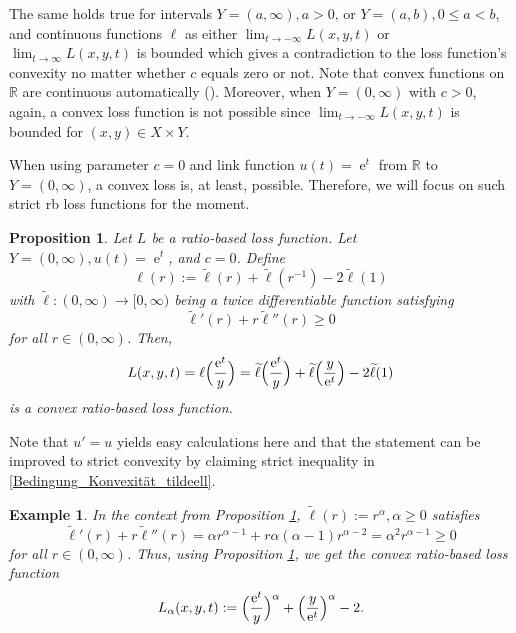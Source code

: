 \documentclass[10pt]{article}
\newcommand{\R}{\mathbb{R}}
\newcommand{\XY}{X \times Y}
\DeclareMathOperator{\e}{e}
\newtheorem{proposition}[theorem]{Proposition}
\newtheorem{example}[theorem]{Example}
\begin{document}
The same holds true for intervals  $Y = (a, \infty), a > 0$, or $Y =(a,b), 0 \leq a < b$, and continuous functions $\ell$ as either $\lim_{t \to -\infty}L(x,y,t)$ or $\lim_{t \to \infty}L(x,y,t)$ is bounded which gives a contradiction to the loss function's convexity no matter whether $c$ equals zero or not.
Note that convex functions on $\R$ are continuous automatically (\cite[Cor. 10.1.1]{Rockafellar1997}).
Moreover, when $Y = (0, \infty)$ with $c > 0$, again, a convex loss function is not possible since $\lim_{t \to -\infty} L(x,y,t)$ is bounded for $(x,y) \in \XY$. \par 
When using parameter $c = 0$ and link function $u(t) = \e^t$ from $\R$ to $Y = (0, \infty)$, a convex loss is, at least, possible.
Therefore, we will focus on such strict rb loss functions for the moment.
\begin{proposition} \label{Prop_konvexeVerlustfkt_tildeEll}
	Let $L$ be a ratio-based loss function.
	Let $Y = (0, \infty), u(t) = \e^t$, and $c = 0$.
	Define
	\begin{equation*}
		\ell(r) := \widetilde{\ell}(r) + \widetilde{\ell}(r^{-1})-2\widetilde{\ell}(1)
	\end{equation*}
	with $\widetilde{\ell}: (0, \infty) \to [0, \infty)$ being a twice differentiable function satisfying
	\begin{equation} \label{Bedingung_Konvexität_tildeell}
		\widetilde{\ell}'(r) + r\widetilde{\ell}''(r) \geq 0
	\end{equation}
	for all $r \in (0, \infty)$.
	Then, 
	\begin{equation} \label{convexLoss}
		L(x,y,t) = \ell\Bigl(\frac{\e^t}{y}\Bigr) = \widetilde{\ell}\Bigl(\frac{\e^t}{y}\Bigr)+\widetilde{\ell}\Bigl(\frac{y}{\e^t}\Bigr) - 2\widetilde{\ell}(1)
	\end{equation}
	is a convex ratio-based loss function.
\end{proposition}
Note that $u' = u$ yields easy calculations here and that the statement can be improved to strict convexity by claiming strict inequality in \eqref{Bedingung_Konvexität_tildeell}.
\begin{example}
	In the context from Proposition \ref{Prop_konvexeVerlustfkt_tildeEll},  $\widetilde{\ell}(r):= r^\alpha, \alpha \geq 0$ satisfies
	\begin{equation*}
		\widetilde{\ell}'(r) + r\widetilde{\ell}''(r) = \alpha r^{\alpha -1} + r \alpha(\alpha-1)r^{\alpha-2} = \alpha^2 r^{\alpha-1} \geq 0
	\end{equation*}
	for all $r \in (0, \infty)$.
	Thus, using Proposition \ref{Prop_konvexeVerlustfkt_tildeEll}, we get the  convex ratio-based loss function
	\begin{equation*}
		L_\alpha(x,y,t) := \Bigl(\frac{\e^t}{y}\Bigr)^\alpha + \Bigl(\frac{y}{\e^t}\Bigr)^\alpha - 2.
	\end{equation*}
\end{example}
\end{document}
